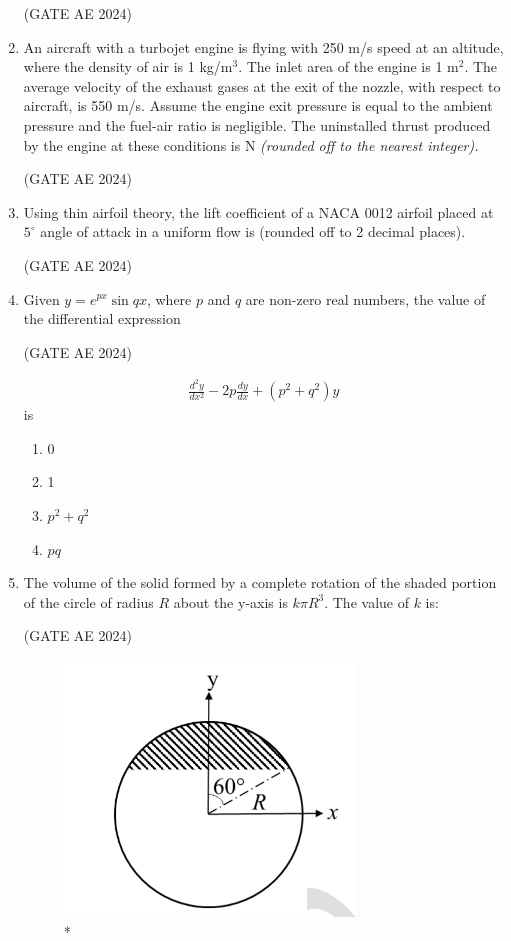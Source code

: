 \documentclass[journal,12pt,onecolumn]{IEEEtran}
\theoremstyle{remark}
\begin{document}
\begin{flushleft}
\begin{enumerate}
\hfill (GATE AE 2024)

\item An aircraft with a turbojet engine is flying with 250 m/s speed at an altitude, where the density of air is 1 kg/m$^3$. The inlet area of the engine is 1 m$^2$. The average velocity of the exhaust gases at the exit of the nozzle, with respect to aircraft, is 550 m/s. Assume the engine exit pressure is equal to the ambient pressure and the fuel-air ratio is negligible. The uninstalled thrust produced by the engine at these conditions is \underline{\hspace{3cm}} N \textit{(rounded off to the nearest integer).}

\hfill (GATE AE 2024)

\item Using thin airfoil theory, the lift coefficient of a NACA 0012 airfoil placed at $5^\circ$ angle of attack in a uniform flow is \underline{\hspace{3cm}} (rounded off to 2 decimal places).

\hfill (GATE AE 2024)

\item  Given $y = e^{px} \sin qx$, where $p$ and $q$ are non-zero real numbers, the value of the differential expression

\hfill (GATE AE 2024)

\begin{align*}
\frac{d^2y}{dx^2} - 2p \frac{dy}{dx} + (p^2 + q^2)y
\end{align*}
is
\begin{enumerate}
    \item 0
    \item 1
    \item $p^2 + q^2$
    \item $pq$
\end{enumerate}

\item  The volume of the solid formed by a complete rotation of the shaded portion of the circle of radius $R$ about the y-axis is $k \pi R^3$. The value of $k$ is:

\hfill (GATE AE 2024)

\begin{figure}[H]
\includegraphics[width=0.35\columnwidth]{figs/37.png}
\caption{*}
    \label{fig:placeholder}
\end{figure}


\end{enumerate}
\end{flushleft}
\end{document}
